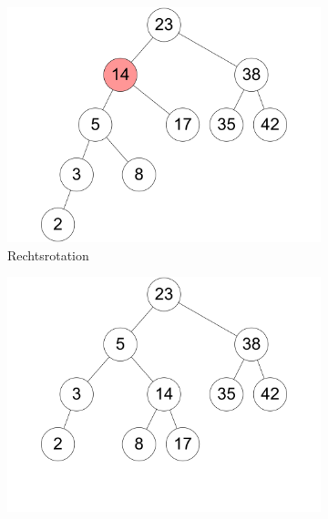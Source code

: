 \documentclass[11pt,a4paper]{article}
\begin{document}
\begin{loesung}
\begin{enumerate}
\begin{figure}[h!]
\begin{subfigure}[b]{0.23\textwidth}
                \includegraphics[width=\textwidth]{img/3a_11}
                \caption*{Rechtsrotation}
            \end{subfigure}
            \begin{subfigure}[b]{0.23\textwidth}
                \centering
                \includegraphics[width=\textwidth]{img/3a_12}
                \caption*{}
            \end{subfigure}
            \\
            \begin{subfigure}[b]{0.23\textwidth}
                \centering

\end{subfigure}
\end{figure}
\end{enumerate}
\end{loesung}
\end{document}
